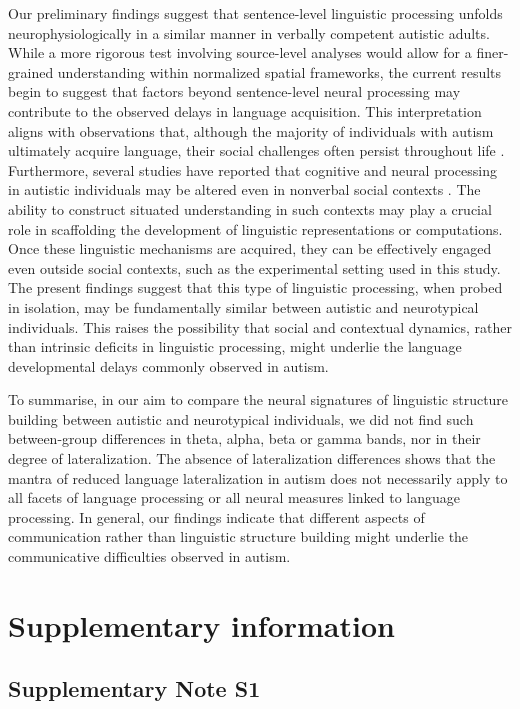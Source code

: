 Our preliminary findings suggest that sentence-level linguistic processing unfolds neurophysiologically in a similar manner in verbally competent autistic adults. While a more rigorous test involving source-level analyses would allow for a finer-grained understanding within normalized spatial frameworks, the current results begin to suggest that factors beyond sentence-level neural processing may contribute to the observed delays in language acquisition. This interpretation aligns with observations that, although the majority of individuals with autism ultimately acquire language, their social challenges often persist throughout life \citep{anderson2007}. Furthermore, several studies have reported that cognitive and neural processing in autistic individuals may be altered even in nonverbal social contexts \citep{mangnus2024bpcnni,wadge2019}. The ability to construct situated understanding in such contexts may play a crucial role in scaffolding the development of linguistic representations or computations. Once these linguistic mechanisms are acquired, they can be effectively engaged even outside social contexts, such as the experimental setting used in this study. The present findings suggest that this type of linguistic processing, when probed in isolation, may be fundamentally similar between autistic and neurotypical individuals. This raises the possibility that social and contextual dynamics, rather than intrinsic deficits in linguistic processing, might underlie the language developmental delays commonly observed in autism. 

To summarise, in our aim to compare the neural signatures of linguistic structure building between autistic and neurotypical individuals, we did not find such between-group differences in theta, alpha, beta or gamma bands, nor in their degree of lateralization. The absence of lateralization differences shows that the mantra of reduced language lateralization in autism does not necessarily apply to all facets of language processing or all neural measures linked to language processing. In general, our findings indicate that different aspects of communication rather than linguistic structure building might underlie the communicative difficulties observed in autism.


\newpage

\section*{Supplementary information}

\subsection*{Supplementary Note S1} \label{suppl-note}

\newpage



